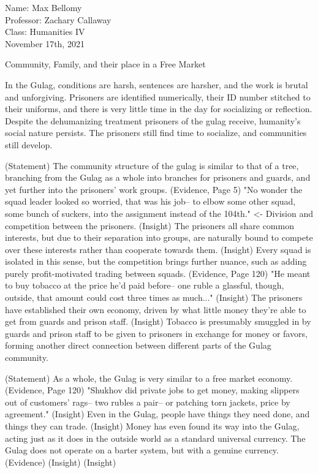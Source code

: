 \documentclass[12pt]{article}
\begin{document}
\begin{flushleft}

Name: Max Bellomy\\
Professor: Zachary Callaway\\
Class: Humanities IV\\
November 17th, 2021\\

\begin{center}
Community, Family, and their place in a Free Market
\end{center}


\setlength{\parindent}{0.5in}


In the Gulag, conditions are harsh, sentences are harsher, and the work is brutal and unforgiving.
Prisoners are identified numerically, their ID number stitched to their uniforms, and there is very little time in the day for socializing or reflection.
Despite the dehumanizing treatment prisoners of the gulag receive, humanity's social nature persists. The prisoners still find time to socialize, and communities still develop.

(Statement) The community structure of the gulag is similar to that of a tree, branching from the Gulag as a whole into branches for prisoners and guards, and yet further into the prisoners' work groups.
(Evidence, Page 5) "No wonder the squad leader looked so worried, that was his job-- to elbow some other squad, some bunch of suckers, into the assignment instead of the 104th." <- Division and competition between the prisoners.
(Insight) The prisoners all share common interests, but due to their separation into groups, are naturally bound to compete over these interests rather than cooperate towards them.
(Insight) Every squad is isolated in this sense, but the competition brings further nuance, such as adding purely profit-motivated trading between squads.
(Evidence, Page 120) "He meant to buy tobacco at the price he'd paid before-- one ruble a glassful, though, outside, that amount could cost three times as much..."  
(Insight) The prisoners have established their own economy, driven by what little money they're able to get from guards and prison staff.
(Insight) Tobacco is presumably smuggled in by guards and prison staff to be given to prisoners in exchange for money or favors, forming another direct connection between different parts of the Gulag community.


(Statement) As a whole, the Gulag is very similar to a free market economy.
(Evidence, Page 120) "Shukhov did private jobs to get money, making slippers out of customers' rags-- two rubles a pair-- or patching torn jackets, price by agreement."
(Insight) Even in the Gulag, people have things they need done, and things they can trade. 
(Insight) Money has even found its way into the Gulag, acting just as it does in the outside world as a standard universal currency. The Gulag does not operate on a barter system, but with a genuine currency.
(Evidence)
(Insight)
(Insight)


\end{flushleft}
\end{document}
